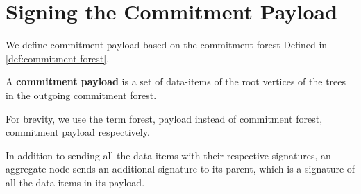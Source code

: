 \section{Signing the Commitment Payload}
		We define commitment payload based on the commitment forest Defined in \ref{def:commitment-forest}.
	\begin{definition}
		A \textbf{commitment payload} is a set of data-items of the root vertices of the trees in the outgoing commitment forest.
	\end{definition}
	For brevity, we use the term forest, payload instead of commitment forest, commitment payload respectively.

	In addition to sending all the data-items with their respective signatures, an aggregate node sends an additional signature to its parent, which is a signature of all the data-items in its payload.

